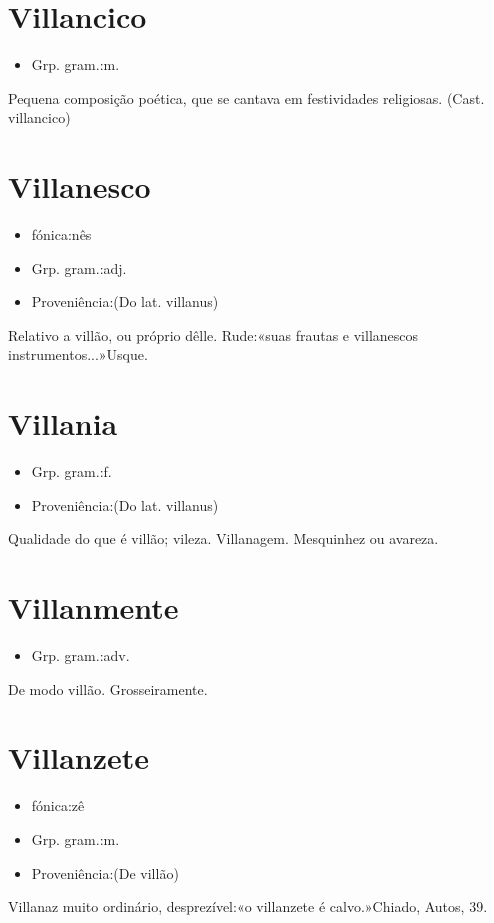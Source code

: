 \documentclass{article}
\begin{document}
\section{Villancico}
\begin{itemize}
\item {Grp. gram.:m.}
\end{itemize}
Pequena composição poética, que se cantava em festividades religiosas.
(Cast. \textunderscore villancico\textunderscore )
\section{Villanesco}
\begin{itemize}
\item {fónica:nês}
\end{itemize}
\begin{itemize}
\item {Grp. gram.:adj.}
\end{itemize}
\begin{itemize}
\item {Proveniência:(Do lat. \textunderscore villanus\textunderscore )}
\end{itemize}
Relativo a villão, ou próprio dêlle.
Rude:«\textunderscore suas frautas e villanescos instrumentos...\textunderscore »Usque.
\section{Villania}
\begin{itemize}
\item {Grp. gram.:f.}
\end{itemize}
\begin{itemize}
\item {Proveniência:(Do lat. \textunderscore villanus\textunderscore )}
\end{itemize}
Qualidade do que é villão; vileza.
Villanagem.
Mesquinhez ou avareza.
\section{Villanmente}
\begin{itemize}
\item {Grp. gram.:adv.}
\end{itemize}
De modo villão.
Grosseiramente.
\section{Villanzete}
\begin{itemize}
\item {fónica:zê}
\end{itemize}
\begin{itemize}
\item {Grp. gram.:m.}
\end{itemize}
\begin{itemize}
\item {Proveniência:(De \textunderscore villão\textunderscore )}
\end{itemize}
Villanaz muito ordinário, desprezível:«\textunderscore o villanzete é calvo.\textunderscore »Chiado, \textunderscore Autos\textunderscore , 39.
\end{document}
